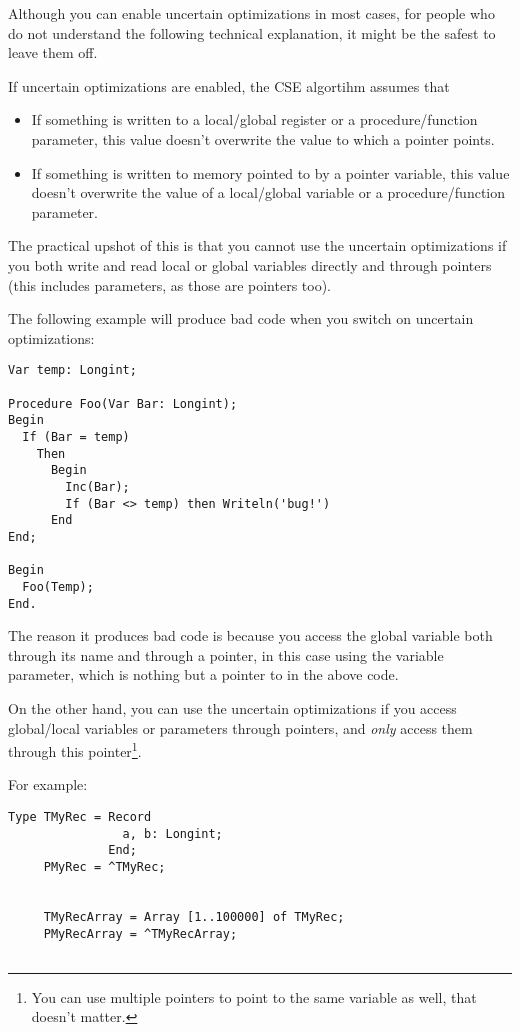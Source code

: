 {\begin{enumerate}
Although you can enable uncertain optimizations in most cases, for people who
do not understand the following technical explanation, it might be the safest to
leave them off.

\begin{remark}If uncertain optimizations are enabled, the CSE algortihm assumes
that
\begin{itemize}
\item If something is written to a local/global register or a
procedure/function parameter, this value doesn't overwrite the value to
which a pointer points.
\item If something is written to memory pointed to by a pointer variable,
this value doesn't overwrite the value of a local/global variable or a
procedure/function parameter.
\end{itemize}
\end{remark}
The practical upshot of this is that you cannot use the uncertain
optimizations if you both write and read local or global variables directly and
through pointers (this includes  parameters, as those are pointers too).

The following example will produce bad code when you switch on
uncertain optimizations:
\begin{verbatim}
Var temp: Longint;

Procedure Foo(Var Bar: Longint);
Begin
  If (Bar = temp)
    Then
      Begin
        Inc(Bar);
        If (Bar <> temp) then Writeln('bug!')
      End
End;

Begin
  Foo(Temp);
End.
\end{verbatim}
The reason it produces bad code is because you access the global variable
 both through its name  and through a pointer, in this
case using the  variable parameter, which is nothing but a pointer
to  in the above code.

On the other hand, you can use the uncertain optimizations if
you access global/local variables or parameters through pointers,
and {\em only} access them through this pointer\footnote{
You can use multiple pointers to point to the same variable as well, that
doesn't matter.}.

For example:
\begin{verbatim}
Type TMyRec = Record
                a, b: Longint;
              End;
     PMyRec = ^TMyRec;


     TMyRecArray = Array [1..100000] of TMyRec;
     PMyRecArray = ^TMyRecArray;


\end{verbatim}
\end{enumerate}}
